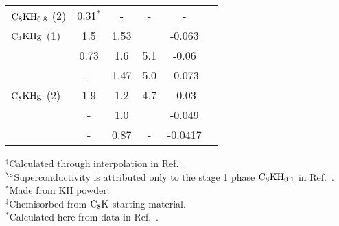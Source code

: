 \begin{table}
\begin{center}
\begin{tabular}{|lc|cccc|}
$\rm C_8KH_{0.8}$ (2) & 0.31$^{\ast}$\cite{suzuki85b} & - & - & -\\
$\rm C_4KHg$ (1) & 1.5\cite{W179} & 1.53\cite{W179} &  & -0.063\cite{W179}\\
& 0.73\cite{tanuma81} & 1.6\cite{yang88} & 5.1\cite{yang88} & -0.06\cite{yang88}\\
&-& 1.47\cite{preil84} & 5.0\cite{fischer85} & -0.073\cite{conard81}\\
$\rm C_8KHg$ (2) & 1.9\cite{pendrys81} & 1.2 & 4.7\cite{yang88} & -0.03\cite{yang88} \\
&-& 1.0\cite{W179}  &  & -0.049\cite{W179} \\
&-& 0.87\cite{preil84} &-& -0.0417\cite{preil84}\\
\hline
\end{tabular}
\end{center}
$^{\dagger}$Calculated through interpolation in Ref.~\cite{enoki85}.\\
$^{\S}$Superconductivity is attributed only to the stage 1  phase $\rm
C_8KH_{0.1}$ in Ref.~\cite{enoki85}.\\
$^{\ast}$Made from KH powder.\\
$^{\ddag}$Chemisorbed from $\rm C_8K$ starting material.\\
$^*$Calculated here from data in Ref.~\cite{E291}.
\end{table}


